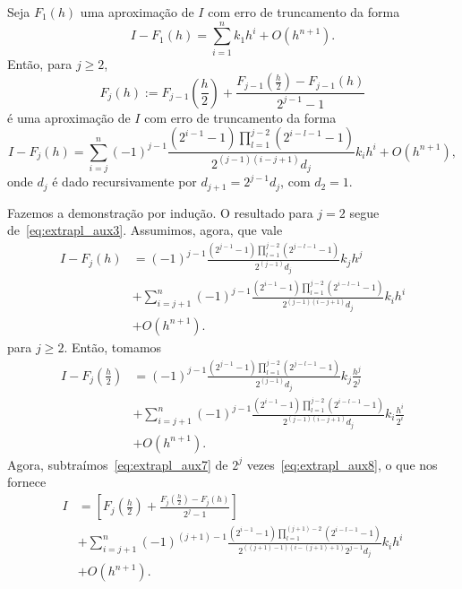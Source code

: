 \begin{teo}
  Seja $F_1(h)$ uma aproximação de $I$ com erro de truncamento da forma
  \begin{equation}
    I-F_1(h) = \sum_{i=1}^n k_1h^i + O(h^{n+1}).
  \end{equation}
Então, para $j\geq 2$,
\begin{equation}
  F_j(h) := F_{j-1}\left(\frac{h}{2}\right) + \frac{F_{j-1}\left(\frac{h}{2}\right) - F_{j-1}(h)}{2^{j-1}-1}
\end{equation}
é uma aproximação de $I$ com erro de truncamento da forma
\begin{equation}
  I-F_{j}(h) = \sum_{i=j}^n (-1)^{j-1}\frac{\left(2^{i-1}-1\right)\prod_{l=1}^{j-2}\left(2^{i-l-1}-1\right)}{2^{(j-1)(i-j+1)}d_j}k_ih^i + O(h^{n+1}),
\end{equation}
onde $d_{j}$ é dado recursivamente por $d_{j+1}=2^{j-1}d_j$, com $d_2=1$.
\end{teo}
\begin{dem}
  Fazemos a demonstração por indução. O resultado para $j=2$ segue de~\eqref{eq:extrapl_aux3}. Assumimos, agora, que vale
  \begin{align}
    I-F_{j}(h) &= (-1)^{j-1}\frac{\left(2^{j-1}-1\right)\prod_{l=1}^{j-2}\left(2^{j-l-1}-1\right)}{2^{(j-1)}d_j}k_jh^j \nonumber \\
              &+ \sum_{i=j+1}^n (-1)^{j-1}\frac{\left(2^{i-1}-1\right)\prod_{l=1}^{j-2}\left(2^{i-l-1}-1\right)}{2^{(j-1)(i-j+1)}d_j}k_ih^i \nonumber \\
              & + O(h^{n+1}).\label{eq:extrapl_aux7}
  \end{align}
para $j\geq 2$. Então, tomamos
\begin{align}
  I-F_{j}\left(\frac{h}{2}\right) &= (-1)^{j-1}\frac{\left(2^{j-1}-1\right)\prod_{l=1}^{j-2}\left(2^{j-l-1}-1\right)}{2^{(j-1)}d_j}k_j\frac{h^j}{2^j} \nonumber \\
              &+ \sum_{i=j+1}^n (-1)^{j-1}\frac{\left(2^{i-1}-1\right)\prod_{l=1}^{j-2}\left(2^{i-l-1}-1\right)}{2^{(j-1)(i-j+1)}d_j}k_i\frac{h^i}{2^i} \nonumber \\
              & + O(h^{n+1}). \label{eq:extrapl_aux8}
\end{align}
Agora, subtraímos~\eqref{eq:extrapl_aux7} de $2^{j}$ vezes~\eqref{eq:extrapl_aux8}, o que nos fornece
\begin{align}
  I &= \left[F_{j}\left(\frac{h}{2}\right) + \frac{F_{j}\left(\frac{h}{2}\right) - F_{j}(h)}{2^{j}-1}\right] \nonumber\\
    &+ \sum_{i=j+1}^n (-1)^{(j+1)-1}\frac{\left(2^{i-1}-1\right)\prod_{l=1}^{(j+1)-2}\left(2^{i-l-1}-1\right)}{2^{((j+1)-1)(i-(j+1)+1)}2^{j-1}d_j}k_ih^i\nonumber \\
              & + O(h^{n+1}).
\end{align}
\end{dem}


\emconstrucao